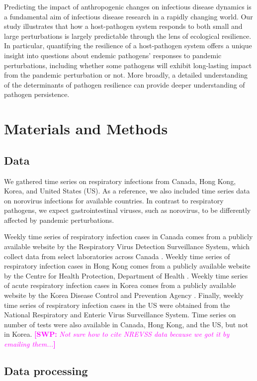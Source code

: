 \documentclass[12pt]{article}
\newcommand{\comment}{\showcomment}
\newcommand{\showcomment}[3]{\textcolor{#1}{\textbf{[#2: }\textsl{#3}\textbf{]}}}
\newcommand{\swp}[1]{\comment{magenta}{SWP}{#1}}
\begin{document}
Predicting the impact of anthropogenic changes on infectious disease dynamics is a fundamental aim of infectious disease research in a rapidly changing world.
Our study illustrates that how a host-pathogen system responds to both small and large perturbations is largely predictable through the lens of ecological resilience.
In particular, quantifying the resilience of a host-pathogen system offers a unique insight into questions about endemic pathogens' responses to pandemic perturbations, including whether some pathogens will exhibit long-lasting impact from the pandemic perturbation or not.
More broadly, a detailed understanding of the determinants of pathogen resilience can provide deeper understanding of pathogen persistence.

\section*{Materials and Methods}

\subsection*{Data}

We gathered time series on respiratory infections from Canada, Hong Kong, Korea, and United States (US).
As a reference, we also included time series data on norovirus infections for available countries.
In contrast to respiratory pathogens, we expect gastrointestinal viruses, such as norovirus, to be differently affected by pandemic perturbations.

Weekly time series of respiratory infection cases in Canada comes from a publicly available website by the Respiratory Virus Detection Surveillance System, which collect data from select laboratories across Canada \citep{phac}.
Weekly time series of respiratory infection cases in Hong Kong comes from a publicly available website by the  Centre for Health Protection, Department of Health \citep{hkdata,hkdata2}.
Weekly time series of acute respiratory infection cases in Korea comes from a publicly available website by the Korea Disease Control and Prevention Agency \citep{kordata}.
Finally, weekly time series of respiratory infection cases in the US were obtained from the National Respiratory and Enteric Virus Surveillance System.
Time series on number of tests were also available in Canada, Hong Kong, and the US, but not in Korea.
\swp{Not sure how to cite NREVSS data because we got it by emailing them...}

\subsection*{Data processing}
\end{document}
